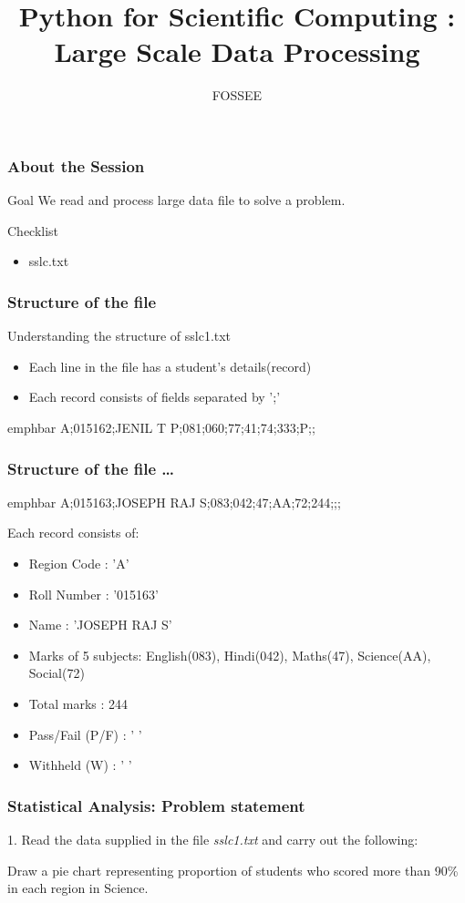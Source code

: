 \documentclass[14pt,compress]{beamer}
\title{Python for Scientific Computing : Large Scale Data Processing}
\author[FOSSEE] {FOSSEE}
\institute[IIT Bombay] {Department of Aerospace Engineering\\IIT Bombay}
\date{}
\newcommand{\emphbar}[1]
{\begin{beamercolorbox}[rounded=true]{emphbar} 
      {#1}
 \end{beamercolorbox}
}
\begin{document}
\begin{frame}
  \maketitle
\end{frame}

\begin{frame}
  \frametitle{About the Session}
  \begin{block}{Goal}
    We read and process large data file to solve a problem.
  \end{block}
  \begin{block}{Checklist}
    \begin{itemize}
    \item sslc.txt
  \end{itemize}
  \end{block}
\end{frame}

\begin{frame}
  \frametitle{Structure of the file}
  Understanding the structure of sslc1.txt
  \begin{itemize}
    \item Each line in the file has a student's details(record)
    \item Each record consists of fields separated by ';'
  \end{itemize}
\emphbar{A;015162;JENIL T P;081;060;77;41;74;333;P;;}
\end{frame}

\begin{frame}
  \frametitle{Structure of the file \ldots}
\emphbar{A;015163;JOSEPH RAJ S;083;042;47;AA;72;244;;;}
  Each record consists of:
  \begin{itemize}
    \item Region Code : 'A'
    \item Roll Number : '015163'
    \item Name : 'JOSEPH RAJ S'
    \item Marks of 5 subjects: English(083), Hindi(042), Maths(47), Science(AA), Social(72)
    \item Total marks : 244
    \item Pass/Fail (P/F) : ' '
    \item Withheld (W) : ' '
  \end{itemize}
\end{frame}

\begin{frame}
  \frametitle{Statistical Analysis: Problem statement}
  1. Read the data supplied in the file \emph{sslc1.txt} and carry out the following:
  \begin{block}{}
    Draw a pie chart representing proportion of students who scored more than 90\% in each region in Science.    
  \end{block}
\end{frame}
\end{document}
